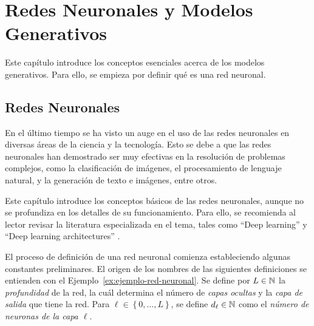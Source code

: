 \chapter{Redes Neuronales y Modelos Generativos}\label{chap:redes-neuronales-y-modelos-generativos}
{
Este capítulo introduce los conceptos esenciales acerca de los modelos generativos. Para ello, se empieza por definir qué es una red neuronal.
\section{Redes Neuronales}\label{sec:redes-Neuronales}
{
    En el último tiempo se ha visto un auge en el uso de las redes neuronales en diversas áreas de la ciencia y la tecnología. Esto se debe a que las redes neuronales han demostrado ser muy efectivas en la resolución de problemas complejos, como la clasificación de imágenes, el procesamiento de lenguaje natural, y la generación de texto e imágenes, entre otros.

    Este capítulo introduce los conceptos básicos de las redes neuronales, aunque no se profundiza en los detalles de su funcionamiento. Para ello, se recomienda al lector revisar la literatura especializada en el tema, tales como ``Deep learning'' \cite{goodfellow2016deep} y ``Deep learning architectures'' \cite{calin2020deep}.

    El proceso de definición de una red neuronal comienza estableciendo algunas constantes preliminares. El origen de los nombres de las siguientes definiciones se entienden con el Ejemplo~\ref{ex:ejemplo-red-neuronal}. Se define por $L\in\mathbb{N}$ la \emph{profundidad} de la red, la cuál determina el número de \textit{capas ocultas} y la \textit{capa de salida} que tiene la red. Para $\ell \in \left\{ 0,\ldots, L \right\}$, se define $d_\ell\in\mathbb{N}$ como el \emph{número de neuronas de la capa $\ell$}.

}}
